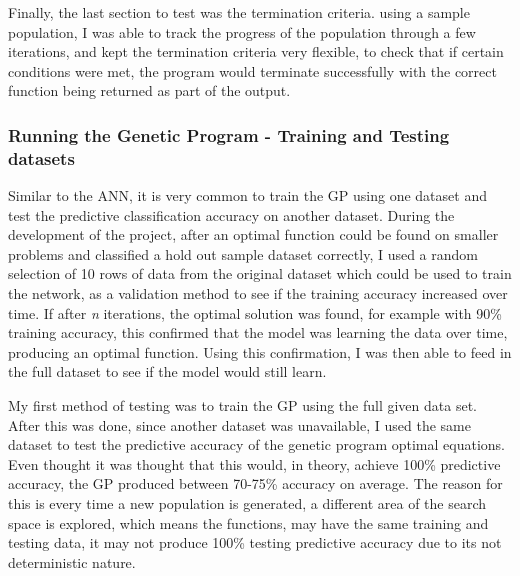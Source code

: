 \documentclass[11pt]{article}
\begin{document}
Finally, the last section to test was the termination criteria. using a sample population, I was able to track the progress of the population through a few iterations, and kept the termination criteria very flexible, to check that if certain conditions were met, the program would terminate successfully with the correct function being returned as part of the output. 
\subsubsection{Running the Genetic Program - Training and Testing datasets}
Similar to the ANN, it is very common to train the GP using one dataset and test the predictive classification accuracy on another dataset. During the development of the project, after an optimal function could be found on smaller problems and classified a hold out sample dataset correctly, I used a random selection of 10 rows of data from the original dataset which could be used to train the network, as a validation method to see if the training accuracy increased over time. If after \textit{n} iterations, the optimal solution was found, for example with 90\% training accuracy, this confirmed that the model was learning the data over time, producing an optimal function. Using this confirmation, I was then able to feed in the full dataset to see if the model would still learn.

My first method of testing was to train the GP using the full given data set. After this was done, since another dataset was unavailable, I used the same dataset to test the predictive accuracy of the genetic program optimal equations. Even thought it was thought that this would, in theory, achieve 100\% predictive accuracy, the GP produced between 70-75\% accuracy on average. The reason for this is every time a new population is generated, a different area of the search space is explored, which means the functions, may have the same training and testing data, it may not produce 100\% testing predictive accuracy due to its not deterministic nature. 
\end{document}
